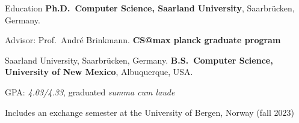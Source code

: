 \begin{rubric}{Education}
\entry*[10/2026 -- Present]%
    \textbf{Ph.D.\ Computer Science, Saarland University}, Saarbr\"ucken, Germany.
    \par Advisor: Prof.\ Andr\'e Brinkmann.
\entry*[10/2024 -- 09/2026]%
    \textbf{CS@max planck graduate program}
    \par Saarland University, Saarbr\"ucken, Germany.
\entry*[08/2020 -- 05/2024]%
    \textbf{B.S.\ Computer Science, University of New Mexico}, Albuquerque, USA.
    \par GPA: \emph{4.03/4.33}, graduated \emph{summa cum laude}
    \par Includes an exchange semester at the University of Bergen, Norway (fall 2023)
\end{rubric}

